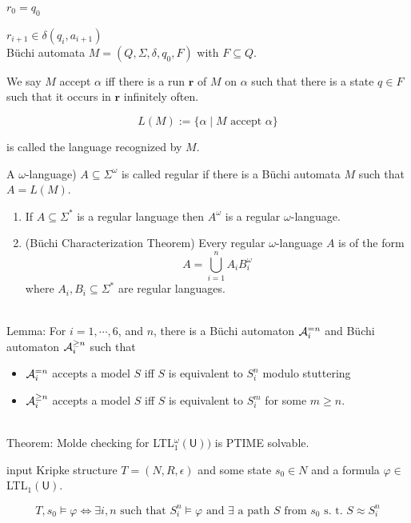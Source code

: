 \documentclass[12pt]{article}
\begin{document}
\begin{CJK*}{GBK}{song}
$r_0=q_0$

$r_{i+1}\in \delta(q_i,a_{i+1})$
\ \\


B\"{u}chi automata $M=(Q,\Sigma,\delta, q_0, F)$ with $F\subseteq Q$.

We say $M$ accept $\alpha$  iff there is a run $\mathbf{r}$ of $M$ on $\alpha$ such that there is a state $q\in F$ such that it occurs in $\mathbf{r}$ infinitely often.

$$L(M):=\{\alpha\mid M \mbox{ accept } \alpha\}$$

is called the language recognized by $M$.

A $\omega$-language) $A\subseteq \Sigma^{\omega}$ is called regular if there is a B\"{u}chi automata $M$ such that $A=L(M)$.



\begin{enumerate}
\item If $A\subseteq\Sigma^*$ is a regular language then $A^{\omega}$ is a regular $\omega$-language.

\item (B\"{u}chi Characterization Theorem) Every regular $\omega$-language $A$ is of the form $$A=\bigcup_{i=1}^nA_iB_i^{\omega}$$
where $A_i, B_i\subseteq \Sigma^*$ are regular languages.
\end{enumerate}
\ \\

Lemma: For $i=1,\cdots,6$, and $n$, there is a B\"{u}chi automaton ${\cal A}_i^{=n}$ and B\"{u}chi automaton ${\cal A}^{\geq n}_i$ such that
\begin{itemize}
\item ${\cal A}_i^{=n}$ accepts a model $S$ iff $S$ is equivalent to $S^n_i$ modulo stuttering
\item ${\cal A}^{\geq n}_i$ accepts a model $S$ iff $S$ is equivalent to $S^m_i$ for some $m\geq n$.
\end{itemize}
\ \\

Theorem: Molde checking for LTL$^\omega_1(\textsf{U}))$ is PTIME solvable.

input Kripke structure $T=(N,R,\epsilon)$ and some state $s_0\in N$ and a formula $\varphi\in $ LTL$_1(\textsf{U})$.

$$T,s_0\models \varphi  \Longleftrightarrow \exists i,n \mbox{ such that }S_i^n\models \varphi \mbox{ and }\exists \mbox{ a path $S$ from $s_0$ s. t. }S\approx S^n_i$$


\end{CJK*}
\end{document}
